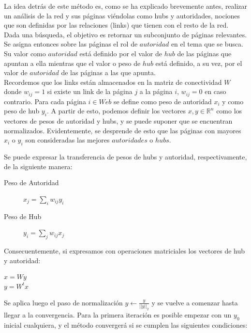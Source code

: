 \documentclass[a4paper]{article}
\begin{document}
La idea detr\'as de este m\'etodo es, como se ha explicado brevemente antes, realizar un an\'{a}lisis de la red y sus p\'aginas vi\'endolas como hubs y autoridades, nociones que son definidas por las relaciones (links) que tienen con el resto de la red.\\

Dada una b\'{u}squeda, el objetivo es retornar un subconjunto de páginas relevantes.
Se asigna entonces sobre las p\'aginas el rol de $autoridad$ en el tema que se busca. Su valor como $autoridad$ est\'a definido por el valor de $hub$ de las p\'{a}ginas que apuntan a ella mientras que el valor o peso de $hub$ est\'a definido, a su vez, por el valor de $autoridad$ de las p\'{a}ginas a las que apunta.\\

Recordemos que los links están almacenados en la matriz de conectividad $W$ donde $w_{ij} = 1$ si existe un link de la p\'agina $j$ a la p\'agina $i$,  $w_{ij} = 0$ en caso contrario. Para cada p\'agina $i \in Web$ se define como peso de autoridad $x_i$ y como peso de hub $y_i$.
A partir de esto, podemos definir los vectores $x,y \in \mathbb{R}^n$ como los vectores de pesos de autoridad y hubs, y se puede suponer que se encuentran normalizados.
Evidentemente, se desprende de esto que las p\'{a}ginas con mayores $x_i$ o $y_i$ son consideradas las mejores $autoridades$ o $hubs$.

Se puede expresar la transferencia de pesos de hubs y autoridad, respectivamente, de la siguiente manera:

\begin{description}

\item[Peso de Autoridad] $x_j = \sum_{i} w_{ij} y_i$

\item[Peso de Hub] $y_i = \sum_{j} w_{ij} x_j$

\end{description}

Consecuentemente, si expresamos con operaciones matriciales los vectores de hub y autoridad:

$x = Wy$ \\
$y = W^tx$

Se aplica luego el paso de normalizaci\'{o}n $y \leftarrow \frac{y}{||y||_2}$ y se vuelve a comenzar hasta llegar a la convergencia.
Para la primera iteraci\'{o}n es posible empezar con un $y_0$ inicial cualquiera, y el m\'{e}todo converger\'{a} si se cumplen las siguientes condiciones:
\end{document}
